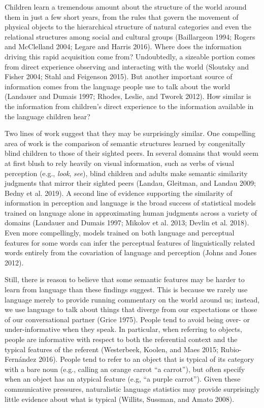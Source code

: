 \documentclass{ucetd}
\begin{document}
Children learn a tremendous amount about the structure of the world
around them in just a few short years, from the rules that govern the
movement of physical objects to the hierarchical structure of natural
categories and even the relational structures among social and cultural
groups (Baillargeon 1994; Rogers and McClelland 2004; Legare and Harris
2016). Where does the information driving this rapid acquisition come
from? Undoubtedly, a sizeable portion comes from direct experience
observing and interacting with the world (Sloutsky and Fisher 2004;
Stahl and Feigenson 2015). But another important source of information
comes from the language people use to talk about the world (Landauer and
Dumais 1997; Rhodes, Leslie, and Tworek 2012). How similar is the
information from children's direct experience to the information
available in the language children hear?

Two lines of work suggest that they may be surprisingly similar. One
compelling area of work is the comparison of semantic structures learned
by congenitally blind children to those of their sighted peers. In
several domains that would seem at first blush to rely heavily on visual
information, such as verbs of visual perception (e.g., \emph{look},
\emph{see}), blind children and adults make semantic similarity
judgments that mirror their sighted peers (Landau, Gleitman, and Landau
2009; Bedny et al. 2019). A second line of evidence supporting the
similarity of information in perception and language is the broad
success of statistical models trained on language alone in approximating
human judgments across a variety of domains (Landauer and Dumais 1997;
Mikolov et al. 2013; Devlin et al. 2018). Even more compellingly, models
trained on both language and perceptual features for some words can
infer the perceptual features of linguistically related words entirely
from the covariation of language and perception (Johns and Jones 2012).

Still, there is reason to believe that some semantic features may be
harder to learn from language than these findings suggest. This is
because we rarely use language merely to provide running commentary on
the world around us; instead, we use language to talk about things that
diverge from our expectations or those of our conversational partner
(Grice 1975). People tend to avoid being over- or under-informative when
they speak. In particular, when referring to objects, people are
informative with respect to both the referential context and the typical
features of the referent (Westerbeek, Koolen, and Maes 2015;
Rubio-Fernández 2016). People tend to refer to an object that is typical
of its category with a bare noun (e.g., calling an orange carrot ``a
carrot''), but often specify when an object has an atypical feature
(e.g, ``a purple carrot''). Given these communicative pressures,
naturalistic language statistics may provide surprisingly little
evidence about what is typical (Willits, Sussman, and Amato 2008).
\end{document}
